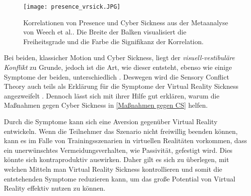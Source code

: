 \begin{figure}[h]
	\centering 
	\texttt{[image: presence\_vrsick.JPG]}
	\caption{Korrelationen von Presence und Cyber Sickness aus der Metaanalyse von Weech et al.\cite{Weech:2019:PresenceCS}. Die Breite der Balken visualisiert die Freiheitsgrade und die Farbe die Signifikanz der Korrelation.}
	\label{abb:presence_vrsick}
\end{figure}

Bei beiden, klassicher Motion und Cyber Sickness, liegt der \textit{visuell-vestibul\"are Konflikt} zu Grunde, jedoch ist die Art, wie dieser entsteht, ebenso wie einige Symptome der beiden, unterschiedlich \cite{Stanney:1997:MSCSSS}. Deswegen wird die Sensory Conflict Theory auch teils als Erkl\"arung f\"ur die Symptome der Virtual Reality Sickness angezweifelt  \cite{Kolasinski:1998:SympCS}. Dennoch l\"asst sich mit ihrer Hilfe gut erkl\"aren, warum die Ma{\ss}nahmen gegen Cyber Sickness in  \autoref{Maßnahmen gegen CS} helfen.

Durch die Symptome kann sich eine Aversion gegen\"uber Virtual Reality entwickeln. Wenn die Teilnehmer das Szenario nicht freiwillig beenden k\"onnen, kann es im Falle von Trainingsszenarien in virtuellen Realit\"aten vorkommen, dass ein unerw\"unschtes Vermeidungsverhalten, wie Passivit\"at, gefestigt wird\cite{Crowley:1987:Avoid}. Dies k\"onnte sich kontraproduktiv auswirken. Daher gilt es sich zu \"uberlegen, mit welchen Mitteln man Virtual Reality Sickness kontrollieren und somit die entstehenden Symptome reduzieren kann, um das gro{\ss}e Potential von Virtual Reality effektiv nutzen zu k\"onnen.

